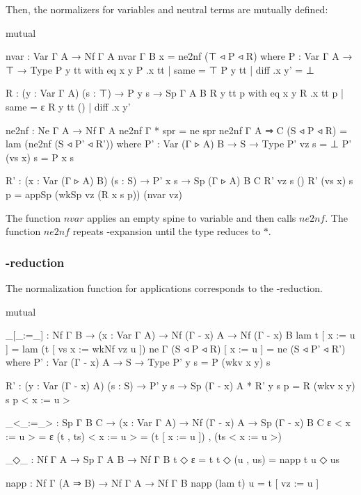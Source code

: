 Then, the normalizers for variables and neutral terms are mutually defined:

\begin{code}[hide]
mutual
\end{code}

\begin{code}
  nvar : Var Γ A → Nf Γ A
  nvar {Γ} {B} x = ne2nf (⊤ ◃ P ◃ R)
    where
    P : Var Γ A → ⊤ → Type
    P y  tt with eq x y
    P .x tt | same = ⊤
    P y  tt | diff .x y' = ⊥

    R : (y : Var Γ A) (s : ⊤) → P y s → Sp Γ A B
    R y tt p with eq x y
    R .x tt p | same = ε
    R y tt () | diff .x y'

  ne2nf : Ne Γ A → Nf Γ A
  ne2nf {Γ} {*} spr = ne spr
  ne2nf {Γ} {A ⇒ C} (S ◃ P ◃ R) = lam (ne2nf (S ◃ P' ◃ R'))
    where
    P' : Var (Γ ▹ A) B → S → Type
    P' vz s = ⊥
    P' (vs x) s = P x s

    R' : (x : Var (Γ ▹ A) B) (s : S) → P' x s → Sp (Γ ▹ A) B C
    R' vz s ()
    R' (vs x) s p = appSp (wkSp vz (R x s p)) (nvar vz)
\end{code}

The function $nvar$ applies an empty spine to variable and then calls $ne2nf$. The function $ne2nf$ repeats \eta-expansion until the type reduces to $*$.

\subsubsection*{\beta-reduction}

The normalization function for applications corresponds to the \beta-reduction.

\begin{code}[hide]
mutual
\end{code}

\begin{code}
  _[_:=_] : Nf Γ B → (x : Var Γ A) → Nf (Γ - x) A → Nf (Γ - x) B
  lam t [ x := u ] = lam (t [ vs x := wkNf vz u ])
  ne {Γ} (S ◃ P ◃ R) [ x := u ] = ne (S ◃ P' ◃ R')
    where
    P' : Var (Γ - x) A → S → Type
    P' y s = P (wkv x y) s

    R' : (y : Var (Γ - x) A) (s : S) → P' y s → Sp (Γ - x) A *
    R' y s p = R (wkv x y) s p < x := u >

  _<_:=_> : Sp Γ B C → (x : Var Γ A) → Nf (Γ - x) A → Sp (Γ - x) B C
  ε < x := u > = ε
  (t , ts) < x := u > = (t [ x := u ]) , (ts < x := u >)

  _◇_ : Nf Γ A → Sp Γ A B → Nf Γ B
  t ◇ ε = t
  t ◇ (u , us) = napp t u ◇ us

  napp : Nf Γ (A ⇒ B) → Nf Γ A → Nf Γ B
  napp (lam t) u = t [ vz := u ]
\end{code}

